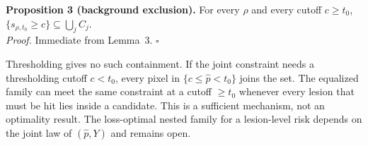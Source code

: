 \medskip\noindent\textbf{Proposition 3 (background exclusion).} For every $\rho$ and every cutoff
$c\ge t_0$, $\{s_{\rho,t_0}\ge c\}\subseteq\bigcup_jC_j$.\\
\emph{Proof.} Immediate from Lemma~3. $\square$

\noindent Thresholding gives no such containment. If the joint constraint needs a
thresholding cutoff $c<t_0$, every pixel in $\{c\le\hat p<t_0\}$ joins the set.
The equalized family can meet the same constraint at a cutoff $\ge t_0$ whenever
every lesion that must be hit lies inside a candidate. This is a sufficient
mechanism, not an optimality result. The loss-optimal nested family for a
lesion-level risk depends on the joint law of $(\hat p,Y)$ and remains open.
